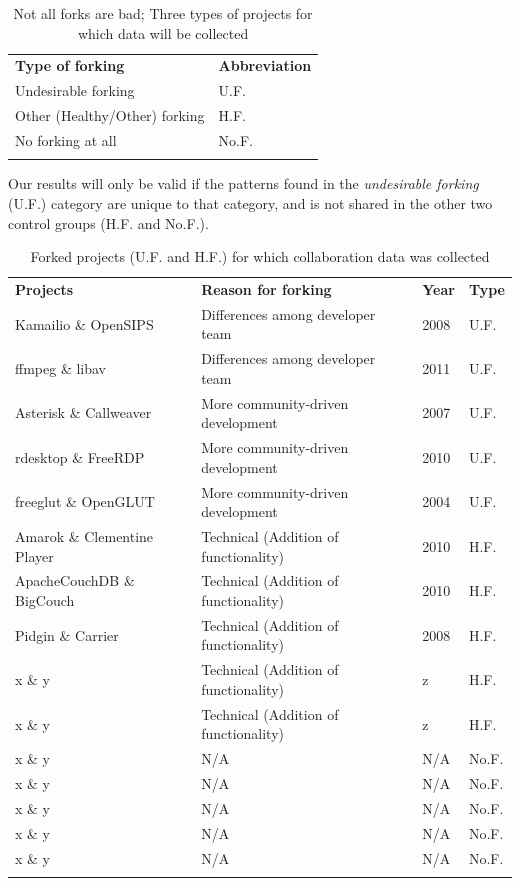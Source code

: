 \documentclass{acm_proc_article-sp}
\begin{document}
\begin{table}[!htbp]
\caption{Not all forks are bad; Three types of projects for which data will be collected}
\label{tableUndesirableForkingDataCollect} 
\begin{tabular}{p{} p{}}
\hline\noalign{\smallskip}
\textbf{Type of forking} & \textbf{Abbreviation} \\
\noalign{\smallskip}\hline\noalign{\smallskip}
Undesirable forking & U.F. \\ \hline
Other (Healthy/Other) forking & H.F. \\\hline
No forking at all & No.F. \\
\noalign{\smallskip}\hline
\end{tabular}
\end{table}

Our results will only be valid if the patterns found in the \textit{undesirable forking} (U.F.) category are unique to that category, and is not shared in the other two control groups (H.F. and No.F.).

\begin{table}[!ht]
\centering
\caption{Forked projects (U.F. and H.F.) for which collaboration data was collected}
\label{forkedProjectsDataCollected}
\begin{tabular}{p{} p{} p{} p{}}
\hline\noalign{\smallskip}
\textbf{Projects} & \textbf{Reason for forking} & \textbf{Year} & \textbf{Type}\\
\noalign{\smallskip}\hline\noalign{\smallskip}
Kamailio \& OpenSIPS & Differences among developer team & 2008 & U.F.\\ \hline
ffmpeg \& libav & Differences among developer team & 2011 & U.F.\\ \hline
Asterisk \& Callweaver & More community-driven development & 2007 & U.F.\\ \hline
rdesktop \& FreeRDP  & More community-driven development & 2010 & U.F.\\ \hline
freeglut \& OpenGLUT & More community-driven development & 2004 & U.F.\\ \hline
Amarok \& Clementine Player & Technical (Addition of functionality) & 2010 & H.F.\\ \hline
ApacheCouchDB \& BigCouch & Technical (Addition of functionality) & 2010 & H.F.\\ \hline
Pidgin \& Carrier & Technical (Addition of functionality) & 2008 & H.F.\\ \hline
x \& y & Technical (Addition of functionality) & z & H.F.\\ \hline
x \& y & Technical (Addition of functionality) & z & H.F.\\ \hline
x \& y & N/A & N/A & No.F.\\ \hline
x \& y & N/A & N/A & No.F.\\ \hline
x \& y & N/A & N/A & No.F.\\ \hline
x \& y & N/A & N/A & No.F.\\ \hline
x \& y & N/A & N/A & No.F.\\
\noalign{\smallskip}\hline
\end{tabular}
\end{table}
\end{document}
